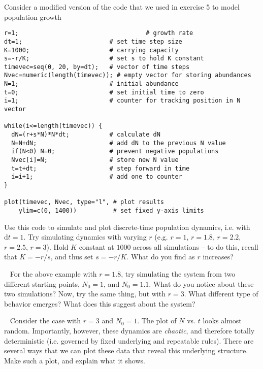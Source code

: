 \documentclass[12pt]{article}
\begin{document}
\date{}
\maketitle


\newline
Consider a modified version of the code that we used in exercise 5 to model population growth
\begin{verbatim}
r=1;					               # growth rate
dt=1;                        # set time step size
K=1000;                      # carrying capacity
s=-r/K;                      # set s to hold K constant
timevec=seq(0, 20, by=dt);   # vector of time steps
Nvec=numeric(length(timevec)); # empty vector for storing abundances
N=1;                         # initial abundance
t=0;                         # set initial time to zero
i=1;                         # counter for tracking position in N vector

while(i<=length(timevec)) {
  dN=(r+s*N)*N*dt;           # calculate dN
  N=N+dN;                    # add dN to the previous N value
  if(N<0) N=0;               # prevent negative populations
  Nvec[i]=N;                 # store new N value
  t=t+dt;                    # step forward in time
  i=i+1;                     # add one to counter
}

plot(timevec, Nvec, type="l", # plot results
	ylim=c(0, 1400))          # set fixed y-axis limits
\end{verbatim}
Use this code to simulate and plot discrete-time population dynamics, i.e. with $\mathrm{d}t = 1$. Try simulating dynamics with varying $r$ (e.g. $r=1$, $r=1.8$, $r=2.2$, $r=2.5$, $r=3$). Hold $K$ constant at $1000$ across all simulations -- to do this, recall that $K = -r/s$, and thus set $s = -r/K$. What do you find as $r$ increases?


~\newline
{}
\newline
For the above example with $r=1.8$, try simulating the system from two different starting points, $N_0 = 1$, and $N_0 = 1.1$. What do you notice about these two simulations? Now, try the same thing, but with $r=3$. What different type of behavior emerges? What does this suggest about the system?

~\newline
{}
\newline
Consider the case with $r=3$ and $N_0 = 1$. The plot of $N$ vs. $t$ looks almost random. Importantly, however, these dynamics are \textit{chaotic}, and therefore totally deterministic (i.e. governed by fixed underlying and repeatable rules). There are several ways that we can plot these data that reveal this underlying structure. Make such a plot, and explain what it shows.
\end{document}

